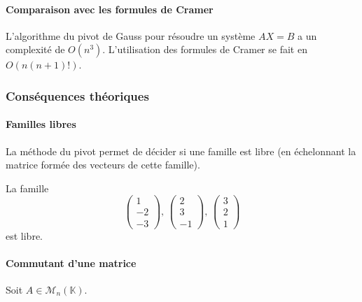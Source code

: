 	\paragraph{Comparaison avec les formules de Cramer}
	
	
	\begin{theorem}
		L'algorithme du pivot de Gauss pour résoudre un système $AX = B$ a un complexité de $O(n^3)$. L'utilisation des formules de Cramer se fait en $O(n(n+1)!)$.
	\end{theorem}
	
	\subsubsection{Conséquences théoriques}
	
	\paragraph{Familles libres}
	
	
	\begin{proposition}
		La méthode du pivot permet de décider si une famille est libre (en échelonnant la matrice formée des vecteurs de cette famille).
	\end{proposition}
	
	\begin{example}
		La famille
		\[ \begin{pmatrix} 1 \\ -2 \\ -3 \end{pmatrix}, \, \begin{pmatrix} 2 \\ 3 \\ -1 \end{pmatrix}, \, \begin{pmatrix} 3 \\ 2 \\ 1 \end{pmatrix} \]
		est libre.
	\end{example}
	
	\paragraph{Commutant d'une matrice}
	
	Soit $A \in \mathcal{M}_n(\mathbb{K})$.
	
	
